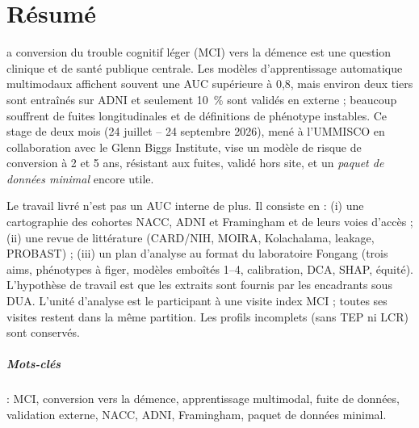 \chapter*{Résumé}

a conversion du trouble cognitif léger (MCI) vers la démence est une question clinique et de santé publique centrale. Les modèles d'apprentissage automatique multimodaux affichent souvent une AUC supérieure à 0,8, mais environ deux tiers sont entraînés sur ADNI et seulement 10~\% sont validés en externe ; beaucoup souffrent de fuites longitudinales et de définitions de phénotype instables. Ce stage de deux mois (24 juillet -- 24 septembre 2026), mené à l'UMMISCO en collaboration avec le Glenn Biggs Institute, vise un modèle de risque de conversion à 2 et 5 ans, résistant aux fuites, validé hors site, et un \emph{paquet de données minimal} encore utile.

Le travail livré n'est pas un AUC interne de plus. Il consiste en : (i) une cartographie des cohortes NACC, ADNI et Framingham et de leurs voies d'accès ; (ii) une revue de littérature (CARD/NIH, MOIRA, Kolachalama, leakage, PROBAST) ; (iii) un plan d'analyse au format du laboratoire Fongang (trois aims, phénotypes à figer, modèles emboîtés 1--4, calibration, DCA, SHAP, équité). L'hypothèse de travail est que les extraits sont fournis par les encadrants sous DUA. L'unité d'analyse est le participant à une visite index MCI ; toutes ses visites restent dans la même partition. Les profils incomplets (sans TEP ni LCR) sont conservés.

\paragraph{Mots-clés} : MCI, conversion vers la démence, apprentissage multimodal, fuite de données, validation externe, NACC, ADNI, Framingham, paquet de données minimal.
